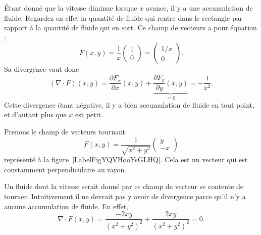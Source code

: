 Étant donné que la vitesse diminue lorsque \( x\) avance, il y a une accumulation de fluide. Regardez en effet la quantité de fluide qui rentre dans le rectangle par rapport à la quantité de fluide qui en sort. Ce champ de vecteurs a pour équation :
\begin{equation}
	F(x,y)=\frac{1}{ x }\begin{pmatrix}
		1 \\
		0
	\end{pmatrix}=\begin{pmatrix}
		1/x \\
		0
	\end{pmatrix}.
\end{equation}
Sa divergence vaut donc
\begin{equation}
	(\nabla\cdot F)(x,y)=\frac{ \partial F_x }{ \partial x }(x,y)+\underbrace{\frac{ \partial F_y }{ \partial y }(x,y)}_{=0}=-\frac{1}{ x^2 }.
\end{equation}
Cette divergence étant négative, il y a bien accumulation de fluide en tout point, et d'autant plus que \( x\) est petit.

\begin{example}     \label{ExamDivFrot}

	Prenons le champ de vecteurs tournant
	\begin{equation}
		F(x,y)=\frac{1}{ \sqrt{x^2+y^2} }\begin{pmatrix}
			y \\
			-x
		\end{pmatrix}
	\end{equation}
	représenté à la figure~\ref{LabelFigYQVHooYsGLHQ}. Cela est un vecteur qui est constamment perpendiculaire au rayon.


	\newcommand{\CaptionFigYQVHooYsGLHQ}{Le champ de vecteurs \( F(x,y)=(y,-x)\).}
	

	Un fluide dont la vitesse serait donné par ce champ de vecteur se contente de tourner. Intuitivement il ne devrait pas y avoir de divergence parce qu'il n'y a aucune accumulation de fluide. En effet,
	\begin{equation}
		\nabla\cdot F(x,y)=\frac{ -2xy }{ (x^2+y^2)^2 }+\frac{ 2xy }{ (x^2+y^2)^2 }=0.
	\end{equation}
\end{example}

